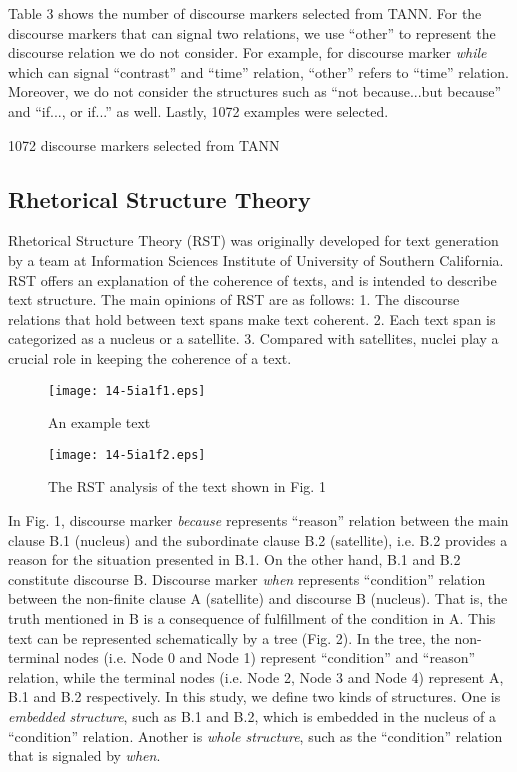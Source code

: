 \documentclass[english]{jnlp_1.3e}
\begin{document}
Table 3 shows the number of discourse markers selected from TANN. For the discourse 
markers that can signal two relations, we use ``other'' 
to represent the discourse relation we do not consider. 
For example, for discourse marker \textit{while} which can signal ``contrast'' 
and ``time'' relation, ``other'' refers to ``time'' relation. 
Moreover, we do not consider the structures 
such as ``not because...but because'' and ``if..., or if...'' as well. 
Lastly, 1072 examples were selected. 

\begin{table}[t]
\caption{1072 discourse markers selected from TANN}

\end{table}



\subsection{Rhetorical Structure Theory}

Rhetorical Structure Theory (RST) was originally developed for text generation by a
team at Information Sciences Institute of University of Southern California.
RST offers an explanation of the coherence of texts, and is intended to describe
text structure. The main opinions of RST are as follows: 1. The discourse relations
that hold between text spans make text coherent. 2. Each text span is categorized
as a nucleus or a satellite. 3. Compared with satellites, nuclei play a crucial role
in keeping the coherence of a text.

\begin{figure}[b]
\begin{center}
\texttt{[image: 14-5ia1f1.eps]}
\end{center}
 \caption{An example text}
\end{figure}
\begin{figure}[b]
\begin{center}
\texttt{[image: 14-5ia1f2.eps]}
\end{center}
 \caption{The RST analysis of the text shown in Fig. 1}
\end{figure}


In Fig. 1, discourse marker \textit{because} represents ``reason'' 
relation between the main clause B.1 (nucleus) and the subordinate clause B.2 
(satellite), i.e. B.2 provides a reason for the situation presented
in B.1. On the other hand, B.1 and B.2 constitute discourse B. 
Discourse marker \textit{when} represents ``condition'' relation 
between the non-finite clause A (satellite) and discourse B (nucleus). 
That is, the truth mentioned in B is a consequence of fulfillment 
of the condition in A. This text can be represented schematically 
by a tree (Fig. 2). In the tree, the non-terminal nodes
(i.e. Node 0 and Node 1) represent ``condition'' and ``reason'' relation,
while the terminal nodes (i.e. Node 2, Node 3 and Node 4) represent A, B.1
and B.2 respectively. In this study, we define two kinds of structures. 
One is \textit{embedded structure}, such as B.1 and B.2, 
which is embedded in the nucleus of a ``condition'' relation. 
Another is \textit{whole structure}, such as the ``condition''
relation that is signaled by \textit{when}.
\end{document}
